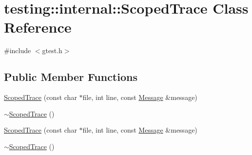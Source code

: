 \hypertarget{classtesting_1_1internal_1_1_scoped_trace}{\section{testing\-:\-:internal\-:\-:Scoped\-Trace Class Reference}
\label{classtesting_1_1internal_1_1_scoped_trace}
}


{\ttfamily \#include $<$gtest.\-h$>$}

\subsection*{Public Member Functions}
\begin{DoxyCompactItemize}
\item 
\hyperlink{classtesting_1_1internal_1_1_scoped_trace_ab965d7010bbbc82c1bef6ebf8748bede}{Scoped\-Trace} (const char $\ast$file, int line, const \hyperlink{classtesting_1_1_message}{Message} \&message)
\item 
\hyperlink{classtesting_1_1internal_1_1_scoped_trace_a658c7c098ff48337058bfa2ccab65881}{$\sim$\-Scoped\-Trace} ()
\item 
\hyperlink{classtesting_1_1internal_1_1_scoped_trace_ab965d7010bbbc82c1bef6ebf8748bede}{Scoped\-Trace} (const char $\ast$file, int line, const \hyperlink{classtesting_1_1_message}{Message} \&message)
\item 
\hyperlink{classtesting_1_1internal_1_1_scoped_trace_a658c7c098ff48337058bfa2ccab65881}{$\sim$\-Scoped\-Trace} ()
\end{DoxyCompactItemize}



